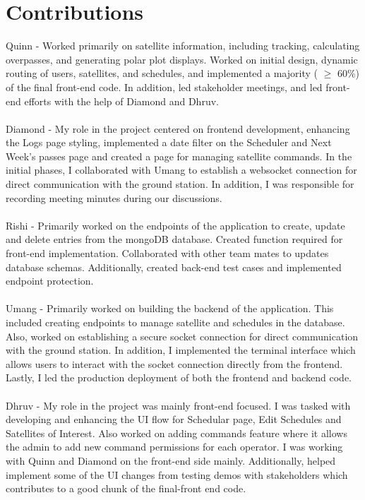 \documentclass{article}
\begin{document}
\section{Contributions}

Quinn - Worked primarily on satellite information, including tracking, calculating overpasses, and generating polar plot displays. Worked on initial design, dynamic routing of users, satellites, and schedules, and implemented a majority ( $\geq$ 60\%) of the final front-end code. In addition, led stakeholder meetings, and led front-end efforts with the help of Diamond and Dhruv.
\\
\\
Diamond - My role in the project centered on frontend development, enhancing the Logs page styling, implemented a date filter on the Scheduler and Next Week's passes page and created a page for managing satellite commands. In the initial phases, I collaborated with Umang to establish a websocket connection for direct communication with the ground station. In addition, I was responsible for recording meeting minutes during our discussions.
\\
\\
Rishi - Primarily worked on the endpoints of the application to create, update and delete entries from the mongoDB database. Created function required for front-end implementation. Collaborated with other team mates to updates database schemas. Additionally, created back-end test cases and implemented endpoint protection.
\\
\\
Umang - Primarily worked on building the backend of the application. This included creating endpoints to manage satellite and schedules in the database. Also, worked on establishing a secure socket connection for direct communication with the ground station. In addition, I implemented the terminal interface which allows users to interact with the socket connection directly from the frontend. Lastly, I led the production deployment of both the frontend and backend code.
\\
\\ 
Dhruv - My role in the project was mainly front-end focused. I was tasked with developing and enhancing the UI flow for Schedular page, Edit Schedules and Satellites of Interest. Also worked on adding commands feature where it allows the admin to add new command permissions for each operator. I was working with Quinn and Diamond on the front-end side mainly. Additionally, helped implement some of the UI changes from testing demos with stakeholders which contributes to a good chunk of the final-front end code. 
\end{document}

